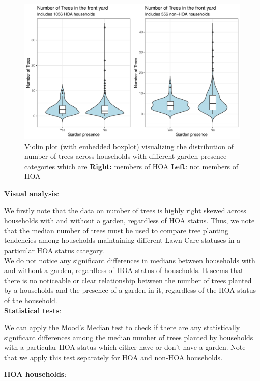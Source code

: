 \documentclass{article}
\begin{document}
\begin{figure}[H]
\centering
\includegraphics{part2-080}
\caption{Violin plot (with embedded boxplot) visualizing the distribution of number of trees across households with different garden presence categories which are \textbf{Right:} members of HOA \textbf{Left}: not members of HOA} \label{Fig:plot1}
\end{figure}

\textbf{Visual analysis}:

We firstly note that the data on number of trees is highly right skewed across households with and without a garden, regardless of HOA status. Thus, we note that the median number of trees must be used to compare tree planting tendencies among households maintaining different Lawn Care statuses in a particular HOA status category. \\

We do not notice any significant differences in medians between households with and without a garden, regardless of HOA status of households. It seems that there is no noticeable or clear relationship between the number of trees planted by a households and the presence of a garden in it, regardless of the HOA status of the household.\\

\textbf{Statistical tests}:

We can apply the Mood's Median test to check if there are any statistically significant differences among the median number of trees planted by households with a particular HOA status which either have or don't have a garden. Note that we apply this test separately for HOA and non-HOA households.

\textbf{HOA households}:
\end{document}
